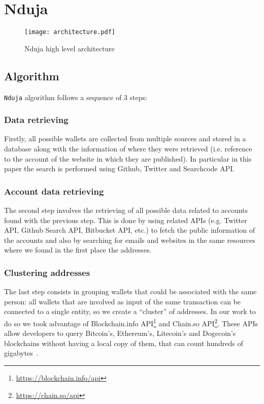 \newcommand{\walletcollector}{\texttt{wallet\_collector}}
\newcommand{\userinforetriever}{\texttt{user\_info\_retriever}}
\newcommand{\addresschecker}{\texttt{address\_checker}}
\newcommand{\graph}{\texttt{graph}}

\section{Nduja} \label{nduja}

\begin{figure*}
    \centering
    \texttt{[image: architecture.pdf]}
    \caption{Nduja high level architecture}
    \label{fig:architecture}
\end{figure*}

\subsection{Algorithm}
\texttt{Nduja} algorithm follows a sequence of 3 steps:
\subsubsection*{Data retrieving} Firstly, all possible wallets are collected
from multiple sources and stored in a database along with the
information of where they were retrieved (i.e. reference to the account of the
website in which they are published). In particular in this paper the search is
performed using Github, Twitter and Searchcode API.

\subsubsection*{Account data retrieving} The second step involves the
retrieving of all possible data related to accounts found with the previous
step. This is done by using related APIs (e.g. Twitter API, Github Search API,
Bitbucket API, etc.) to fetch the public information of the accounts and also
by searching for emails and websites in the same resources where we found in
the first place the addresses.

\subsubsection*{Clustering addresses} The last step consists in grouping
wallets that could be associated with the same person: all wallets that are
involved as input of the same transaction can be connected to a single
entity, so we create a ``cluster'' of addresses. In our work to do so we
took advantage of
Blockchain.info API\footnote{\url{https://blockchain.info/api}} and
Chain.so API\footnote{\url{https://chain.so/api}}. These APIs allow
developers to query Bitcoin's, Ethereum's, Litecoin's and Dogecoin's
blockchains without having a local copy of them, that can count
hundreds of gigabytes~\cite{bib:bitinfochart}.

